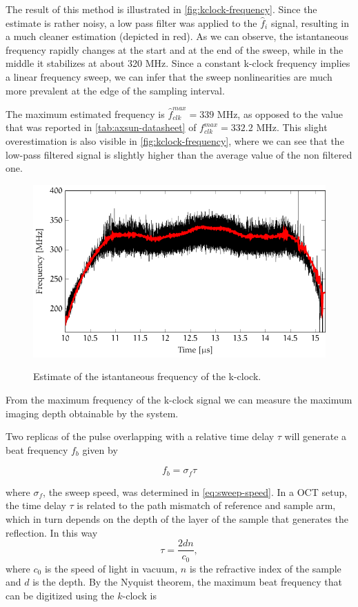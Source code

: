 The result of this method is illustrated in \autoref{fig:kclock-frequency}. Since the estimate is rather noisy, a low pass filter was applied to the $\hat{f}_i$ signal, resulting in a much cleaner estimation (depicted in red). As we can observe, the istantaneous frequency rapidly changes at the start and at the end of the sweep, while in the middle it stabilizes at about 320 MHz. Since a constant k-clock frequency implies a linear frequency sweep, we can infer that the sweep nonlinearities are much more prevalent at the edge of the sampling interval. 

The maximum estimated frequency is $\hat{f}_{clk}^{max} = 339$ MHz, as opposed to the value that was reported in \autoref{tab:axsun-datasheet} of $f_{clk}^{max} = 332.2$ MHz. This slight overestimation is also visible in \autoref{fig:kclock-frequency}, where we can see that the low-pass filtered signal is slightly higher than the average value of the non filtered one.

\begin{figure}[hbt]
	\myfloatalign
	{\includegraphics[width=0.8\linewidth]{gfx/ch3/lowpass}}\\
	\caption{Estimate of the istantaneous frequency of the k-clock.}\label{fig:kclock-frequency}
\end{figure}

From the maximum frequency of the k-clock signal we can measure the maximum imaging depth obtainable by the system. 

Two replicas of the pulse overlapping with a relative time delay $\tau$ will generate a beat frequency $f_b$ given by

	\begin{equation}
		f_b = \sigma_f \tau
	\end{equation}
	
where $\sigma_f$, the sweep speed, was determined in \autoref{eq:sweep-speed}. In a OCT setup, the time delay $\tau$ is related to the path mismatch of reference and sample arm, which in turn depends on the depth of the layer of the sample that generates the reflection. In this way	
	\begin{equation}
		\tau = \frac{2dn}{c_0},
	\end{equation}
where $c_0$ is the speed of light in vacuum, $n$ is the refractive index of the sample and $d$ is the depth. By the Nyquist theorem, the maximum beat frequency that can be digitized using the $k$-clock is
	
